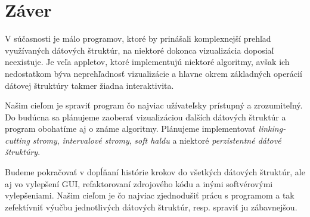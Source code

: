 \section{Záver}

V súčasnosti je málo programov, ktoré by prinášali komplexnejší prehľad 
využívaných dátových štruktúr, na niektoré dokonca vizualizácia doposiaľ 
neexistuje. Je veľa appletov, ktoré implementujú niektoré algoritmy, avšak 
ich nedostatkom býva neprehľadnosť vizualizácie a hlavne okrem základných 
operácií dátovej štruktúry takmer žiadna interaktivita. 

Našim cieľom je spraviť program čo najviac užívateľsky prístupný a zrozumiteľný. 
Do budúcna sa plánujeme zaoberať vizualizáciou ďalších dátových 
štruktúr a program obohatíme aj o známe algoritmy. Plánujeme implementovať 
\emph{linking-cutting stromy}, \emph{intervalové stromy}, \emph{soft haldu} 
a niektoré \emph{perzistentné dátové štruktúry}.

Budeme pokračovať v 
dopĺňaní histórie krokov do všetkých dátových štruktúr, ale aj vo vylepšení 
GUI, refaktorovaní zdrojového kódu a inými softvérovými vylepšeniami. Našim 
cieľom je čo najviac zjednodušiť prácu s programom a tak zefektívniť výučbu 
jednotlivých dátových štruktúr, resp. spraviť ju zábavnejšou.
